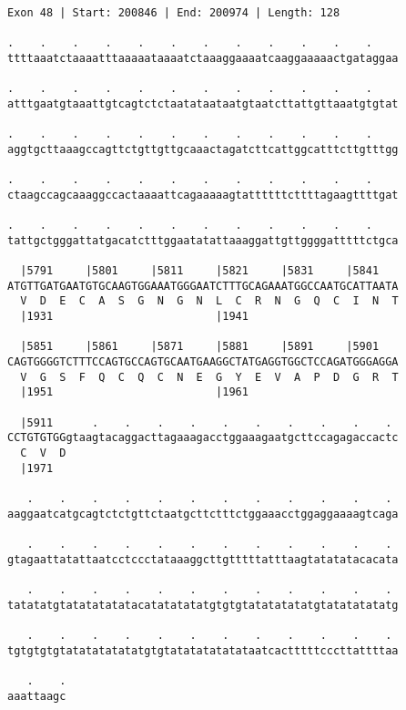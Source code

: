 \documentclass{article}
\begin{document}
\begin{Verbatim}
Exon 48 | Start: 200846 | End: 200974 | Length: 128
 
.    .    .    .    .    .    .    .    .    .    .    .    
ttttaaatctaaaatttaaaaataaaatctaaaggaaaatcaaggaaaaactgataggaa
  
.    .    .    .    .    .    .    .    .    .    .    .    
atttgaatgtaaattgtcagtctctaatataataatgtaatcttattgttaaatgtgtat
  
.    .    .    .    .    .    .    .    .    .    .    .    
aggtgcttaaagccagttctgttgttgcaaactagatcttcattggcatttcttgtttgg
  
.    .    .    .    .    .    .    .    .    .    .    .    
ctaagccagcaaaggccactaaaattcagaaaaagtattttttcttttagaagttttgat
  
.    .    .    .    .    .    .    .    .    .    .    .    
tattgctgggattatgacatctttggaatatattaaaggattgttggggatttttctgca
  
  |5791     |5801     |5811     |5821     |5831     |5841   
ATGTTGATGAATGTGCAAGTGGAAATGGGAATCTTTGCAGAAATGGCCAATGCATTAATA
  V  D  E  C  A  S  G  N  G  N  L  C  R  N  G  Q  C  I  N  T
  |1931                         |1941                       
  
  |5851     |5861     |5871     |5881     |5891     |5901   
CAGTGGGGTCTTTCCAGTGCCAGTGCAATGAAGGCTATGAGGTGGCTCCAGATGGGAGGA
  V  G  S  F  Q  C  Q  C  N  E  G  Y  E  V  A  P  D  G  R  T
  |1951                         |1961                       
  
  |5911      .    .    .    .    .    .    .    .    .    . 
CCTGTGTGGgtaagtacaggacttagaaagacctggaaagaatgcttccagagaccactc
  C  V  D                                                   
  |1971                                                     
  
   .    .    .    .    .    .    .    .    .    .    .    . 
aaggaatcatgcagtctctgttctaatgcttctttctggaaacctggaggaaaagtcaga
  
   .    .    .    .    .    .    .    .    .    .    .    . 
gtagaattatattaatcctccctataaaggcttgtttttatttaagtatatatacacata
  
   .    .    .    .    .    .    .    .    .    .    .    . 
tatatatgtatatatatatacatatatatatgtgtgtatatatatatgtatatatatatg
  
   .    .    .    .    .    .    .    .    .    .    .    . 
tgtgtgtgtatatatatatatgtgtatatatatatataatcactttttcccttattttaa
  
   .    .
aaattaagc
\end{Verbatim}
\newpage
\end{document}
